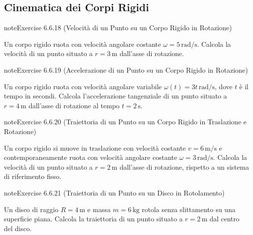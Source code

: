 \documentclass[letterpaper,10pt,italian]{jupyterBook}
\begin{document}
\subsection{Cinematica dei Corpi Rigidi}
\label{\detokenize{ch/mechanics/kinematics-problems:cinematica-dei-corpi-rigidi}} \label{exercise:ch/mechanics/kinematics-problems-exercise-17}

\begin{sphinxadmonition}{note}{Exercise 6.6.18 (Velocità di un Punto su un Corpo Rigido in Rotazione)}



\sphinxAtStartPar
Un corpo rigido ruota con velocità angolare costante \(\omega = 5 \, \text{rad/s}\). Calcola la velocità di un punto situato a \(r = 3 \, \text{m}\) dall’asse di rotazione.
\end{sphinxadmonition}
 \label{exercise:ch/mechanics/kinematics-problems-exercise-18}

\begin{sphinxadmonition}{note}{Exercise 6.6.19 (Accelerazione di un Punto su un Corpo Rigido in Rotazione)}



\sphinxAtStartPar
Un corpo rigido ruota con velocità angolare variabile \(\omega(t) = 3t \, \text{rad/s}\), dove \(t\) è il tempo in secondi. Calcola l’accelerazione tangenziale di un punto situato a \(r = 4 \, \text{m}\) dall’asse di rotazione al tempo \(t = 2 \, \text{s}\).
\end{sphinxadmonition}
 \label{exercise:ch/mechanics/kinematics-problems-exercise-19}

\begin{sphinxadmonition}{note}{Exercise 6.6.20 (Traiettoria di un Punto su un Corpo Rigido in Traslazione e Rotazione)}



\sphinxAtStartPar
Un corpo rigido si muove in traslazione con velocità costante \(v = 6 \, \text{m/s}\) e contemporaneamente ruota con velocità angolare costante \(\omega = 3 \, \text{rad/s}\). Calcola la velocità di un punto situato a \(r = 2 \, \text{m}\) dall’asse di rotazione, rispetto a un sistema di riferimento fisso.
\end{sphinxadmonition}
 \label{exercise:ch/mechanics/kinematics-problems-exercise-20}

\begin{sphinxadmonition}{note}{Exercise 6.6.21 (Traiettoria di un Punto su un Disco in Rotolamento)}



\sphinxAtStartPar
Un disco di raggio \(R = 4 \, \text{m}\) e massa \(m = 6 \, \text{kg}\) rotola senza slittamento su una superficie piana. Calcola la traiettoria di un punto situato a \(r = 2 \, \text{m}\) dal centro del disco.
\end{sphinxadmonition}
 \label{exercise:ch/mechanics/kinematics-problems-exercise-21}
\end{document}
